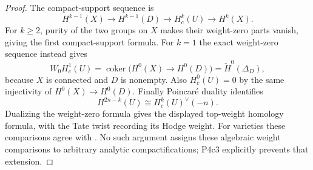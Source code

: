 \begin{proof}
The compact-support sequence is
\[
 H^{k-1}(X)\longrightarrow H^{k-1}(D)
 \longrightarrow H_c^k(U)\longrightarrow H^k(X).
\]
For $k\ge2$, purity of the two groups on $X$ makes their weight-zero parts vanish, giving the first compact-support formula. For $k=1$ the exact weight-zero sequence instead gives
\[
 W_0H_c^1(U)=\operatorname{coker}\bigl(H^0(X)\to H^0(D)\bigr)
 =\widetilde H^0(\Delta_D),
\]
because $X$ is connected and $D$ is nonempty. Also $H_c^0(U)=0$ by the same injectivity of $H^0(X)\to H^0(D)$. Finally Poincaré duality identifies
\[
 H^{2n-k}(U)\cong H_c^k(U)^\vee(-n).
\]
Dualizing the weight-zero formula gives the displayed top-weight homology formula, with the Tate twist recording its Hodge weight. For varieties these comparisons agree with \cite[Proposition~4.2 and Theorem~4.4]{Payne2013}. No such argument assigns these algebraic weight comparisons to arbitrary analytic compactifications; P4c3 explicitly prevents that extension.
\end{proof}

